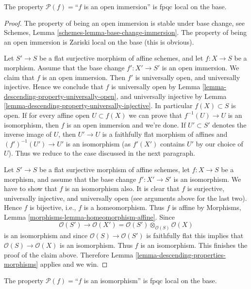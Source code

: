 \begin{lemma}
\label{lemma-descending-property-open-immersion}
The property $\mathcal{P}(f) =$``$f$ is an open immersion''
is fpqc local on the base.
\end{lemma}

\begin{proof}
The property of being an open immersion is stable under base change,
see Schemes, Lemma \ref{schemes-lemma-base-change-immersion}.
The property of being an open immersion is Zariski local on the base
(this is obvious).

\medskip\noindent
Let $S' \to S$ be a flat surjective morphism of affine schemes,
and let $f : X \to S$ be a morphism. Assume that the base change
$f' : X' \to S'$ is an open immersion. We claim that $f$ is an
open immersion.
Then $f'$ is universally open, and universally injective.
Hence we conclude that $f$ is universally open by
Lemma \ref{lemma-descending-property-universally-open}, and
universally injective by
Lemma \ref{lemma-descending-property-universally-injective}.
In particular $f(X) \subset S$ is open. If for every affine
open $U \subset f(X)$ we can prove that $f^{-1}(U) \to U$
is an isomorphism, then $f$ is an open immersion and we're done.
If $U' \subset S'$ denotes the inverse image of $U$,
then $U' \to U$ is a faithfully flat morphism of affines and
$(f')^{-1}(U') \to U'$ is an isomorphism (as $f'(X')$ contains $U'$
by our choice of $U$). Thus we reduce to the case discussed
in the next paragraph.

\medskip\noindent
Let $S' \to S$ be a flat surjective morphism of affine schemes,
let $f : X \to S$ be a morphism, and assume that the base change
$f' : X' \to S'$ is an isomorphism. We have to show that $f$ is an
isomorphism also. It is clear that $f$ is surjective, universally injective,
and universally open (see arguments above for the last two).
Hence $f$ is bijective, i.e., $f$ is a homeomorphism.
Thus $f$ is affine by
Morphisms, Lemma \ref{morphisms-lemma-homeomorphism-affine}.
Since
$$
\mathcal{O}(S') \to
\mathcal{O}(X') =
\mathcal{O}(S') \otimes_{\mathcal{O}(S)} \mathcal{O}(X)
$$
is an isomorphism and since $\mathcal{O}(S) \to \mathcal{O}(S')$
is faithfully flat this implies that $\mathcal{O}(S) \to \mathcal{O}(X)$
is an isomorphism. Thus $f$ is an isomorphism. This finishes the proof of
the claim above.
Therefore Lemma \ref{lemma-descending-properties-morphisms} applies and we win.
\end{proof}

\begin{lemma}
\label{lemma-descending-property-isomorphism}
The property $\mathcal{P}(f) =$``$f$ is an isomorphism''
is fpqc local on the base.
\end{lemma}


